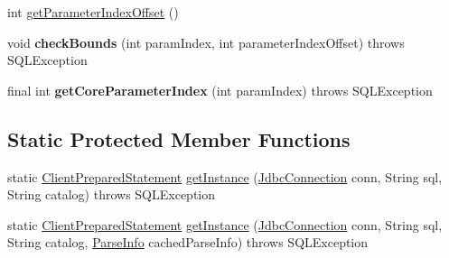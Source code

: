 \begin{DoxyCompactItemize}
int \mbox{\hyperlink{classcom_1_1mysql_1_1cj_1_1jdbc_1_1_client_prepared_statement_afdf6283ef90f080a94509fa39905e3ca}{get\+Parameter\+Index\+Offset}} ()
\item 
\mbox{\label{classcom_1_1mysql_1_1cj_1_1jdbc_1_1_client_prepared_statement_a0a3f2b5e075cf12e681586a5f7e2a5d2}} 
void {\bfseries check\+Bounds} (int param\+Index, int parameter\+Index\+Offset)  throws S\+Q\+L\+Exception 
\item 
\mbox{\label{classcom_1_1mysql_1_1cj_1_1jdbc_1_1_client_prepared_statement_a3a9ad28da0a88ee861d1484c872ea206}} 
final int {\bfseries get\+Core\+Parameter\+Index} (int param\+Index)  throws S\+Q\+L\+Exception 
\end{DoxyCompactItemize}
\subsection*{Static Protected Member Functions}
\begin{DoxyCompactItemize}
\item 
static \mbox{\hyperlink{classcom_1_1mysql_1_1cj_1_1jdbc_1_1_client_prepared_statement}{Client\+Prepared\+Statement}} \mbox{\hyperlink{classcom_1_1mysql_1_1cj_1_1jdbc_1_1_client_prepared_statement_a907760e4207f15f30fe7d2506e240b2c}{get\+Instance}} (\mbox{\hyperlink{interfacecom_1_1mysql_1_1cj_1_1jdbc_1_1_jdbc_connection}{Jdbc\+Connection}} conn, String sql, String catalog)  throws S\+Q\+L\+Exception 
\item 
static \mbox{\hyperlink{classcom_1_1mysql_1_1cj_1_1jdbc_1_1_client_prepared_statement}{Client\+Prepared\+Statement}} \mbox{\hyperlink{classcom_1_1mysql_1_1cj_1_1jdbc_1_1_client_prepared_statement_a5b030cdd8620573bcb233f877acc30b5}{get\+Instance}} (\mbox{\hyperlink{interfacecom_1_1mysql_1_1cj_1_1jdbc_1_1_jdbc_connection}{Jdbc\+Connection}} conn, String sql, String catalog, \mbox{\hyperlink{classcom_1_1mysql_1_1cj_1_1_parse_info}{Parse\+Info}} cached\+Parse\+Info)  throws S\+Q\+L\+Exception 
\end{DoxyCompactItemize}
